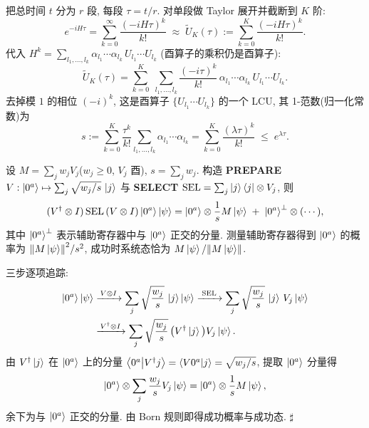 \documentclass[utf8]{article} %
\numberwithin{equation}{section}   %
\newtheorem{Def}{\hskip 2em {\color{green} 定义}}[subsection]
\newtheorem{Lem}{\hskip 2em {\color{magenta} 引理}}[subsection]
\newenvironment{Proof}[1][\relax]{{\noindent\it Proof\ifx\relax#1\relax\else\ (#1)\fi:}\quad}{\hfill $\sharp$\par}
\begin{document}
\begin{Def}[截断 Taylor 级数]
    把总时间 $t$ 分为 $r$ 段, 每段 $\tau = t/r$. 对单段做 Taylor 展开并截断到 $K$ 阶:
    \begin{equation}
        e^{-iH\tau} = \sum_{k=0}^{\infty} \frac{(-iH\tau)^k}{k!}
        \;\approx\; \widetilde U_K(\tau) := \sum_{k=0}^{K} \frac{(-iH\tau)^k}{k!}.
    \end{equation}
    代入 $H^k = \sum_{l_1,\dots,l_k}\alpha_{l_1}\cdots\alpha_{l_k}\, U_{l_1}\cdots U_{l_k}$
    (酉算子的乘积仍是酉算子):
    \begin{equation}
        \widetilde U_K(\tau) = \sum_{k=0}^{K}\;\sum_{l_1,\dots,l_k}
        \frac{(-i\tau)^k}{k!}\,\alpha_{l_1}\cdots\alpha_{l_k}\,
        U_{l_1}\cdots U_{l_k}.
    \end{equation}
    去掉模 $1$ 的相位 $(-i)^k$, 这是酉算子 $\{U_{l_1}\cdots U_{l_k}\}$ 的一个 LCU, 
    其 1-范数(归一化常数)为
    \begin{equation}
        s := \sum_{k=0}^{K}\frac{\tau^k}{k!}\sum_{l_1,\dots,l_k}\alpha_{l_1}\cdots\alpha_{l_k}
        = \sum_{k=0}^{K}\frac{(\lambda\tau)^k}{k!} \;\le\; e^{\lambda\tau}.
    \end{equation}
\end{Def}

\begin{Lem}[LCU 引理]
    设 $M = \sum_j w_j V_j$($w_j \ge 0$, $V_j$ 酉), $s = \sum_j w_j$. 构造
    \textbf{PREPARE} $V: \ket{0^a}\mapsto \sum_j \sqrt{w_j/s}\,\ket{j}$ 与
    \textbf{SELECT} $\mathrm{SEL} = \sum_j \ket{j}\bra{j}\otimes V_j$, 则
    \begin{equation}
        (V^\dagger\otimes I)\,\mathrm{SEL}\,(V\otimes I)\ket{0^a}\ket{\psi}
        = \ket{0^a}\otimes \frac{1}{s}M\ket{\psi} \;+\; \ket{0^a}^{\perp}\otimes(\cdots),
    \end{equation}
    其中 $\ket{0^a}^{\perp}$ 表示辅助寄存器中与 $\ket{0^a}$ 正交的分量.
    测量辅助寄存器得到 $\ket{0^a}$ 的概率为 $\norm{M\ket{\psi}}^2/s^2$,
    成功时系统态恰为 $M\ket{\psi}/\norm{M\ket{\psi}}$.
\end{Lem}

\begin{Proof}
    三步逐项追踪:
    \begin{equation*}
    \begin{aligned}
        \ket{0^a}\ket{\psi}
        &\xrightarrow{\,V\otimes I\,} \sum_j \sqrt{\frac{w_j}{s}}\,\ket{j}\ket{\psi}
        \xrightarrow{\;\mathrm{SEL}\;} \sum_j \sqrt{\frac{w_j}{s}}\,\ket{j}\,V_j\ket{\psi} \\
        &\xrightarrow{\,V^\dagger\otimes I\,}
        \sum_j \sqrt{\frac{w_j}{s}}\,\big(V^\dagger\ket{j}\big)V_j\ket{\psi}.
    \end{aligned}
    \end{equation*}
    由 $V^\dagger\ket{j}$ 在 $\ket{0^a}$ 上的分量 $\braket{0^a}{V^\dagger j}
    = \braket{V 0^a}{j} = \sqrt{w_j/s}$, 提取 $\ket{0^a}$ 分量得
    \[ \ket{0^a}\otimes\sum_j\frac{w_j}{s}V_j\ket{\psi}
       = \ket{0^a}\otimes\frac{1}{s}M\ket{\psi}, \]
    余下为与 $\ket{0^a}$ 正交的分量. 由 Born 规则即得成功概率与成功态.
\end{Proof}
\end{document}
